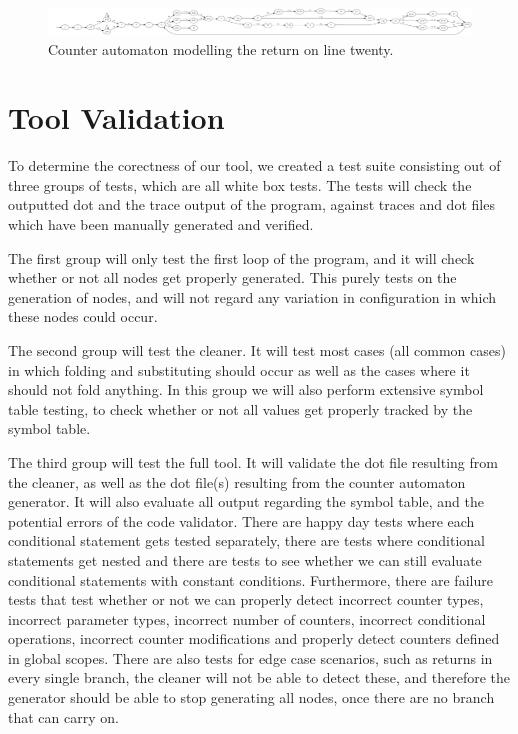 \documentclass[12pt]{article}
\begin{document}
\begin{landscape}
	\begin{figure}
		\centering
		\includegraphics[width=\linewidth]{final_overview_11}
		\caption{Counter automaton modelling the return on line twenty.}
		\label{fig:final_overview_11}
	\end{figure}
\end{landscape}

\section{Tool Validation}
To determine the corectness of our tool, we created a test suite consisting out of three groups of tests, which are all white box tests. The tests will check the outputted dot and the trace output of the program, against traces and dot files which have been manually generated and verified.

The first group will only test the first loop of the program, and it will check whether or not all nodes get properly generated. This purely tests on the generation of nodes, and will not regard any variation in configuration in which these nodes could occur.

The second group will test the cleaner. It will test most cases (all common cases) in which folding and substituting should occur as well as the cases where it should not fold anything. In this group we will also perform extensive symbol table testing, to check whether or not all values get properly tracked by the symbol table.

The third group will test the full tool. It will validate the dot file resulting from the cleaner, as well as the dot file(s) resulting from the counter automaton generator. It will also evaluate all output regarding the symbol table, and the potential errors of the code validator. There are happy day tests where each conditional statement gets tested separately, there are tests where conditional statements get nested and there are tests to see whether we can still evaluate conditional statements with constant conditions. Furthermore, there are failure tests that test whether or not we can properly detect incorrect counter types, incorrect parameter types, incorrect number of counters, incorrect conditional operations, incorrect counter modifications and properly detect counters defined in global scopes. There are also tests for edge case scenarios, such as returns in every single branch, the cleaner will not be able to detect these, and therefore the generator should be able to stop generating all nodes, once there are no branch that can carry on.
\end{document}
